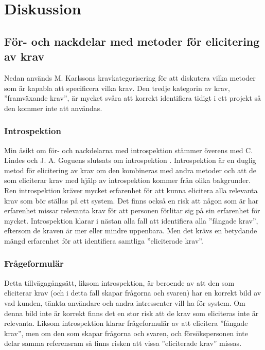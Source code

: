 \section{Diskussion}
\label{sec:discussion-jannering}

\subsection{För- och nackdelar med metoder för elicitering av krav}
Nedan används M. Karlssons kravkategorisering för att diskutera vilka metoder som är kapabla att specificera vilka krav. Den tredje kategorin av krav, ”framväxande krav”, är mycket svåra att korrekt identifiera tidigt i ett projekt så den kommer inte att användas.
\subsubsection{Introspektion}
Min åsikt om för- och nackdelarna med introspektion stämmer överens med C. Lindes och J. A. Goguens slutsats om introspektion \cite{goguen1993techniques}. Introspektion är en duglig metod för elicitering av krav om den kombineras med andra metoder och att de som eliciterar krav med hjälp av introspektion kommer från olika bakgrunder. Ren introspektion kräver mycket erfarenhet för att kunna elicitera alla relevanta krav som bör ställas på ett system. Det finns också en risk att någon som är har erfarenhet missar relevanta krav för att personen förlitar sig på sin erfarenhet för mycket. Introspektion klarar i nästan alla fall att identifiera alla ”fångade krav”, eftersom de kraven är mer eller mindre uppenbara. Men det krävs en betydande mängd erfarenhet för att identifiera samtliga ”eliciterade krav”.

\subsubsection{Frågeformulär}
Detta tillvägagångsätt, liksom introspektion, är beroende av att den som eliciterar krav (och i detta fall skapar frågorna och svaren) har en korrekt bild av vad kunden, tänkta användare och andra intressenter vill ha för system. Om denna bild inte är korrekt finns det en stor risk att de krav som eliciteras inte är relevanta. Liksom introspektion klarar frågeformulär av att elicitera ”fångade krav”, men om den som skapar frågorna och svaren, och försökspersonen inte delar samma referensram så finns risken att vissa ”eliciterade krav” missas. 

